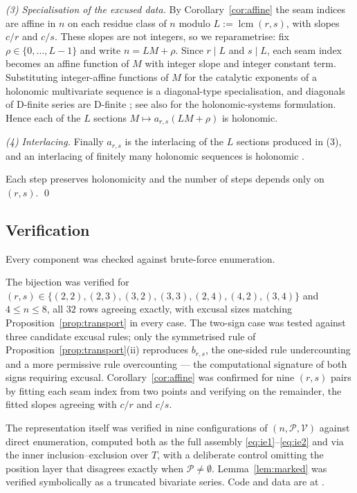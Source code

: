 \documentclass[11pt]{article}
\theoremstyle{definition}
\begin{document}
\emph{(3) Specialisation of the excused data.} By Corollary~\ref{cor:affine}
the seam indices are affine in $n$ on each residue class of $n$ modulo
$L:=\operatorname{lcm}(r,s)$, with slopes $c/r$ and $c/s$. These slopes are not
integers, so we reparametrise: fix $\rho\in\{0,\dots,L-1\}$ and write
$n=LM+\rho$. Since $r\mid L$ and $s\mid L$, each seam index becomes an affine
function of $M$ with integer slope and integer constant term. Substituting
integer-affine functions of $M$ for the catalytic exponents of a holonomic
multivariate sequence is a diagonal-type specialisation, and diagonals of
D-finite series are D-finite \cite{LipshitzDiag}; see also \cite[\S2]{Zeilberger}
for the holonomic-systems formulation. Hence each of the $L$ sections
$M\mapsto a_{r,s}(LM+\rho)$ is holonomic.

\emph{(4) Interlacing.} Finally $a_{r,s}$ is the interlacing of the $L$
sections produced in (3), and an interlacing of finitely many holonomic
sequences is holonomic \cite[Ch.~7]{KauersPaule}.

Each step preserves holonomicity and the number of steps depends only on
$(r,s)$. \qed

\subsection{Verification}

Every component was checked against brute-force enumeration.

The bijection was verified for
$(r,s)\in\{(2,2),(2,3),(3,2),(3,3),(2,4),(4,2),(3,4)\}$ and $4\le n\le 8$, all
$32$ rows agreeing exactly, with excusal sizes matching
Proposition~\ref{prop:transport} in every case. The two-sign case was tested
against three candidate excusal rules; only the symmetrised rule of
Proposition~\ref{prop:transport}(ii) reproduces $b_{r,s}$, the one-sided rule
undercounting and a more permissive rule overcounting --- the computational
signature of both signs requiring excusal. Corollary~\ref{cor:affine} was
confirmed for nine $(r,s)$ pairs by fitting each seam index from two points and
verifying on the remainder, the fitted slopes agreeing with $c/r$ and $c/s$.

The representation itself was verified in nine configurations of
$(n,\mathcal P,\mathcal V)$ against direct enumeration, computed both as the
full assembly \eqref{eq:ie1}--\eqref{eq:ie2} and via the inner
inclusion--exclusion over $T$, with a deliberate control omitting the position
layer that disagrees exactly when $\mathcal P\ne\emptyset$.
Lemma~\ref{lem:marked} was verified symbolically as a truncated bivariate
series. Code and data are at \cite{repoCh3}.
\end{document}
